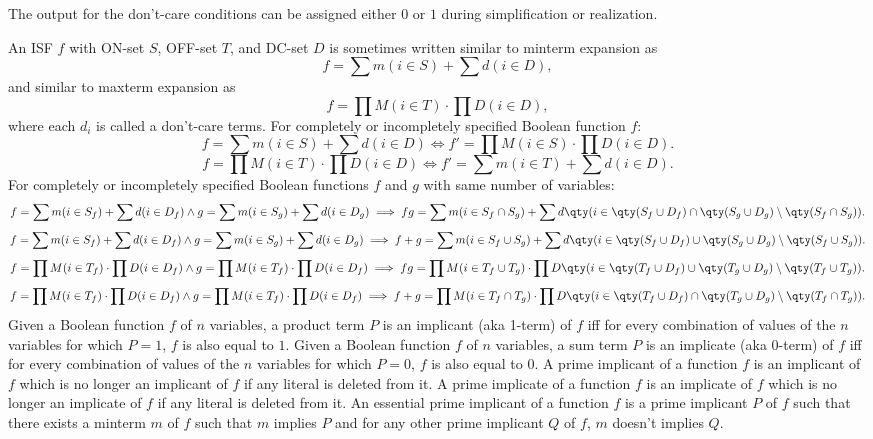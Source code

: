 \documentclass[a4paper,12pt]{article}
\begin{document}
\begin{itemize}
\begin{itemize}
\begin{itemize}
\begin{itemize}
\begin{itemize}
\begin{itemize}
\begin{itemize}
\begin{itemize}
\begin{itemize}
The output for the don't-care conditions can be assigned either $0$ or $1$ during simplification or realization.

An ISF $f$ with ON-set $S$, OFF-set $T$, and DC-set $D$ is sometimes written similar to minterm expansion as
\[f=\sum m(i\in S)+\sum d(i\in D),\]
and similar to maxterm expansion as
\[f=\prod M(i\in T)\cdot\prod D(i\in D),\]
where each $d_i$ is called a don't-care terms.
For completely or incompletely specified Boolean function $f$:
\[f=\sum m(i\in S)+\sum d(i\in D)\iff f'=\prod M(i\in S)\cdot\prod D(i\in D).\]
\[f=\prod M(i\in T)\cdot\prod D(i\in D)\iff f'=\sum m(i\in T)+\sum d(i\in D).\]
For completely or incompletely specified Boolean functions $f$ and $g$ with same number of variables:
\[f=\sum m(i\in S_f)+\sum d(i\in D_f)\land g=\sum m(i\in S_g)+\sum d(i\in D_g)\implies fg=\sum m(i\in S_f\cap S_g)+\sum d\qty(i\in\qty(S_f\cup D_f)\cap\qty(S_g\cup D_g)\setminus\qty(S_f\cap S_g)).\]
\[f=\sum m(i\in S_f)+\sum d(i\in D_f)\land g=\sum m(i\in S_g)+\sum d(i\in D_g)\implies f+g=\sum m(i\in S_f\cup S_g)+\sum d\qty(i\in\qty(S_f\cup D_f)\cup\qty(S_g\cup D_g)\setminus\qty(S_f\cup S_g)).\]
\[f=\prod M(i\in T_f)\cdot\prod D(i\in D_f)\land g=\prod M(i\in T_f)\cdot\prod D(i\in D_f)\implies fg=\prod M(i\in T_f\cup T_g)\cdot\prod D\qty(i\in\qty(T_f\cup D_f)\cup\qty(T_g\cup D_g)\setminus\qty(T_f\cup T_g)).\]
\[f=\prod M(i\in T_f)\cdot\prod D(i\in D_f)\land g=\prod M(i\in T_f)\cdot\prod D(i\in D_f)\implies f+g=\prod M(i\in T_f\cap T_g)\cdot\prod D\qty(i\in\qty(T_f\cup D_f)\cap\qty(T_g\cup D_g)\setminus\qty(T_f\cap T_g)).\]
Given a Boolean function $f$ of $n$ variables, a product term $P$ is an implicant (aka 1-term) of $f$ iff for every combination of values of the $n$ variables for which $P = 1$, $f$ is also equal to $1$.
Given a Boolean function $f$ of $n$ variables, a sum term $P$ is an implicate (aka 0-term) of $f$ iff for every combination of values of the $n$ variables for which $P = 0$, $f$ is also equal to $0$.
A prime implicant of a function $f$ is an implicant of $f$ which is no longer an implicant of $f$ if any literal is deleted from it.
A prime implicate of a function $f$ is an implicate of $f$ which is no longer an implicate of $f$ if any literal is deleted from it.
An essential prime implicant of a function $f$ is a prime implicant $P$ of $f$ such that there exists a minterm $m$ of $f$ such that $m$ implies $P$ and for any other prime implicant $Q$ of $f$, $m$ doesn't implies $Q$.

\end{itemize}
\end{itemize}
\end{itemize}
\end{itemize}
\end{itemize}
\end{itemize}
\end{itemize}
\end{itemize}
\end{itemize}
\end{document}
